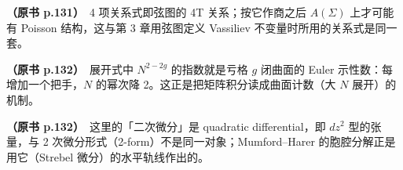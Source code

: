 \noindent \textbf{（原书 p.131）}\ 4 项关系式即弦图的 4T 关系；按它作商之后 $A(\Sigma)$ 上才可能有 Poisson 结构，这与第 3 章用弦图定义 Vassiliev 不变量时所用的关系式是同一套。\par\smallskip

\noindent \textbf{（原书 p.132）}\ 展开式中 $N^{2-2g}$ 的指数就是亏格 $g$ 闭曲面的 Euler 示性数：每增加一个把手，$N$ 的幂次降 2。这正是把矩阵积分读成曲面计数（大 $N$ 展开）的机制。\par\smallskip

\noindent \textbf{（原书 p.132）}\ 这里的「二次微分」是 quadratic differential，即 $dz^{2}$ 型的张量，与 2 次微分形式（2-form）不是同一对象；Mumford--Harer 的胞腔分解正是用它（Strebel 微分）的水平轨线作出的。\par\smallskip
